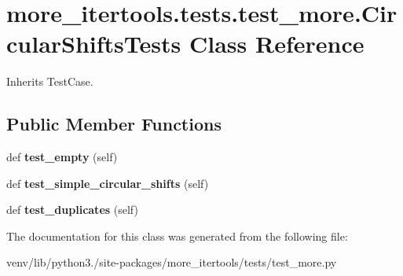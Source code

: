 \hypertarget{classmore__itertools_1_1tests_1_1test__more_1_1_circular_shifts_tests}{}\section{more\+\_\+itertools.\+tests.\+test\+\_\+more.\+Circular\+Shifts\+Tests Class Reference}
\label{classmore__itertools_1_1tests_1_1test__more_1_1_circular_shifts_tests}


Inherits Test\+Case.

\subsection*{Public Member Functions}
\begin{DoxyCompactItemize}
\item 
\mbox{\label{classmore__itertools_1_1tests_1_1test__more_1_1_circular_shifts_tests_a4e37559602ce25f32716349dd1f1b17d}} 
def {\bfseries test\+\_\+empty} (self)
\item 
\mbox{\label{classmore__itertools_1_1tests_1_1test__more_1_1_circular_shifts_tests_a8f15b7d45b00f5625c505e416b332cab}} 
def {\bfseries test\+\_\+simple\+\_\+circular\+\_\+shifts} (self)
\item 
\mbox{\label{classmore__itertools_1_1tests_1_1test__more_1_1_circular_shifts_tests_ab0bdc9015c888babfef2db3646c2e713}} 
def {\bfseries test\+\_\+duplicates} (self)
\end{DoxyCompactItemize}


The documentation for this class was generated from the following file\+:\begin{DoxyCompactItemize}
\item 
venv/lib/python3./site-\/packages/more\+\_\+itertools/tests/test\+\_\+more.\+py\end{DoxyCompactItemize}
